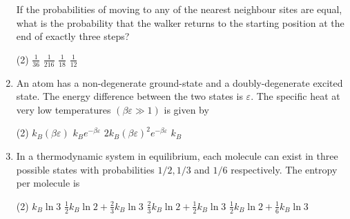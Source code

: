 \begin{enumerate}
If the probabilities of moving to any of the nearest neighbour sites are equal, what is the probability that the walker returns to the starting position at the end of exactly three steps?
 \begin{tasks}(2)
	\task[\textbf{a.}]$\frac{1}{36}$
	\task[\textbf{b.}]$\frac{1}{216}$
	\task[\textbf{c.}] $\frac{1}{18}$
	\task[\textbf{d.}] $\frac{1}{12}$
\end{tasks}
\item 
	An atom has a non-degenerate ground-state and a doubly-degenerate excited state. The energy difference between the two states is $\varepsilon$. The specific heat at very low temperatures $(\beta \varepsilon \gg 1)$ is given by
	 \begin{tasks}(2)
		\task[\textbf{a.}]$k_{B}(\beta \varepsilon)$
		\task[\textbf{b.}]$k_{B} e^{-\beta \varepsilon}$
		\task[\textbf{c.}] $2 k_{B}(\beta \varepsilon)^{2} e^{-\beta \varepsilon}$
		\task[\textbf{d.}]  $k_{B}$
	\end{tasks}
\item In a thermodynamic system in equilibrium, each molecule can exist in three possible states with probabilities $1 / 2,1 / 3$ and $1 / 6$ respectively. The entropy per molecule is
 \begin{tasks}(2)
	\task[\textbf{a.}] $k_{B} \ln 3$
	\task[\textbf{b.}]$\frac{1}{2} k_{B} \ln 2+\frac{2}{3} k_{B} \ln 3$
	\task[\textbf{c.}]$\frac{2}{3} k_{B} \ln 2+\frac{1}{2} k_{B} \ln 3$
	\task[\textbf{d.}] $\frac{1}{2} k_{B} \ln 2+\frac{1}{6} k_{B} \ln 3$
\end{tasks}
\end{enumerate}